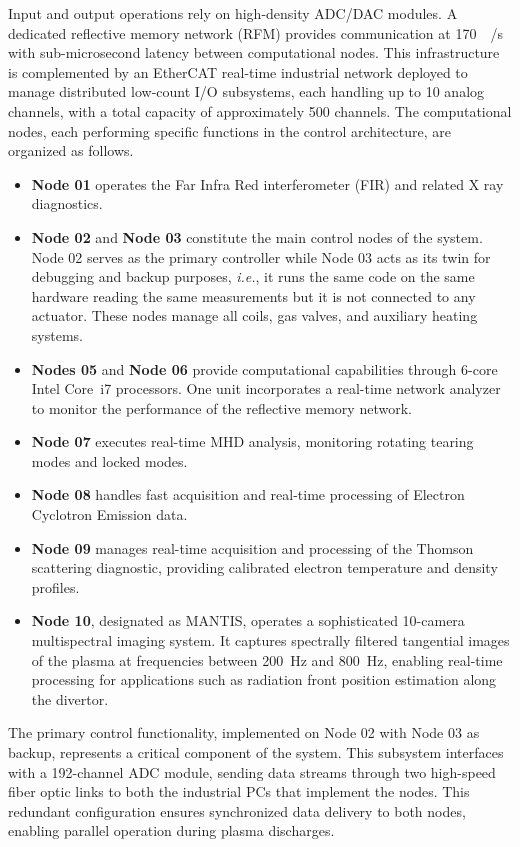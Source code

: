 Input and output operations rely on high-density ADC/DAC modules. A dedicated reflective memory network (RFM) provides communication at \SI{170}{\mega\byte/\second} with sub-microsecond latency between computational nodes. This infrastructure is complemented by an EtherCAT real-time industrial network deployed to manage distributed low-count I/O subsystems, each handling up to 10 analog channels, with a total capacity of approximately 500 channels. The computational nodes, each performing specific functions in the control architecture, are organized as follows.
\begin{itemize}
  \item \textbf{Node 01} operates the Far Infra Red interferometer (FIR) and related X ray diagnostics.
  \item \textbf{Node 02} and \textbf{Node 03} constitute the main control nodes of the system. Node 02 serves as the primary controller while Node 03 acts as its twin for debugging and backup purposes, \emph{i.e.}, it runs the same code on the same hardware reading the same measurements but it is not connected to any actuator. These nodes manage all coils, gas valves, and auxiliary heating systems.
  \item \textbf{Nodes 05} and \textbf{Node 06} provide computational capabilities through 6-core  Intel Core~i7 processors. One unit incorporates a real-time network analyzer to monitor the performance of the reflective memory network.
  \item \textbf{Node 07} executes real-time MHD analysis, monitoring rotating tearing modes and locked modes.
  \item \textbf{Node 08} handles fast acquisition and real-time processing of Electron Cyclotron Emission data.
  \item \textbf{Node 09} manages real-time acquisition and processing of the Thomson scattering diagnostic, providing calibrated electron temperature and density profiles.
  \item \textbf{Node 10}, designated as MANTIS, operates a sophisticated 10-camera multispectral imaging system. It captures spectrally filtered tangential images of the plasma at frequencies between \SI{200}{\hertz} and \SI{800}{\hertz}, enabling real-time processing for applications such as radiation front position estimation along the divertor.
\end{itemize}
The primary control functionality, implemented on Node 02 with Node 03 as backup, represents a critical component of the system. This subsystem interfaces with a 192-channel ADC module, sending data streams through two high-speed fiber optic links to both the industrial PCs that implement the nodes. This redundant configuration ensures synchronized data delivery to both nodes, enabling parallel operation during plasma discharges.

